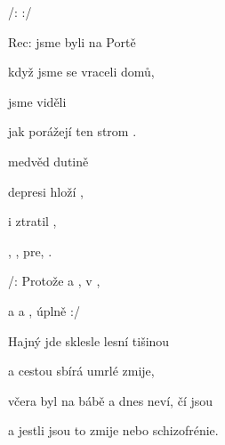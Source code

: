 

/:     :/

Rec:     jsme byli  na Portě  

 když jsme se vraceli  domů, 

 jsme viděli 

jak porážejí   ten strom .    

\zs
{} medvěd   dutině 

  depresi  hloží ,

  i  ztratil ,

, , pre, .
\ks

\zr
/: Protože  a ,  v  ,   

 a  a , úplně      :/
\kr

\zs
Hajný jde sklesle lesní tišinou

a cestou sbírá umrlé zmije,

včera byl na bábě a dnes neví, čí jsou

a jestli jsou to zmije nebo schizofrénie.
\ks

\zr  \kr

\kp






















